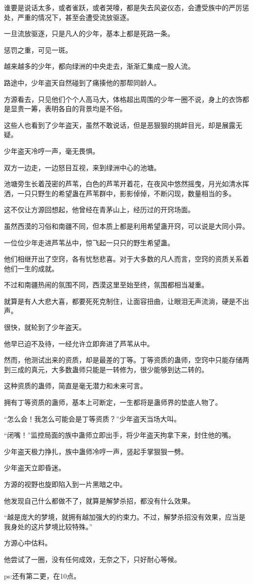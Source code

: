 \begin{this_body}
谁要是说话太多，或者雀跃，或者哭嚎，都是失去风姿仪态，会遭受族中的严厉惩处，严重的情况下，甚至会遭受流放驱逐。

一旦流放驱逐，只是凡人的少年，基本上都是死路一条。

惩罚之重，可见一斑。

越来越多的少年，都向绿洲的中央走去，渐渐汇集成一股人流。

路途中，少年盗天自然碰到了痛揍他的那帮同龄人。

方源看去，只见他们个个人高马大，体格超出周围的少年一圈不说，身上的衣饰都是显贵一筹，表明各自的背景均是不俗。

这些人也看到了少年盗天，虽然不敢说话，但是恶狠狠的挑衅目光，却是展露无疑。

少年盗天冷哼一声，毫无畏惧。

双方一边走，一边怒目互视，来到绿洲中心的池塘。

池塘旁生长着茂密的芦苇，白色的芦苇开着花，在夜风中悠然摇曳，月光如清水挥洒，一只只野生的希望蛊在芦苇群中，影影倬倬，不断闪现，数量相当的多。

这不仅让方源回想起，他曾经在青茅山上，经历过的开窍场面。

虽然西漠的习俗和南疆不同，但本质上都是利用希望蛊开窍，可以说是大同小异。

一位位少年走进芦苇丛中，惊飞起一只只的野生希望蛊。

他们相继开出了空窍，各有忧愁悲喜。对于大多数的凡人而言，空窍的资质关系着他们一生的成就。

不过和南疆热闹的氛围不同，西漠这里至始至终，氛围都相当凝重。

就算是有人大悲大喜，都要死死克制住，让面容扭曲，让眼泪无声流淌，硬是不出声。

很快，就轮到了少年盗天。

他早已迫不及待，一经允许立即奔进了芦苇从中。

然而，他测试出来的资质，却是最差的丁等。丁等资质的蛊师，空窍中只能存储两到三成的真元，大多数蛊师只能是一转修为，很少能够到达二转的。

这种资质的蛊师，简直是毫无潜力和未来可言。

拥有丁等资质的蛊师，基本上可断定，一生都将是蛊师界的垫底人物了。

“怎么会！我怎么可能会是丁等资质？”少年盗天当场大叫。

“闭嘴！”监控局面的族中蛊师立即出手，将少年盗天拘拿下来，封住他的嘴。

少年盗天极力挣扎，族中蛊师冷哼一声，竖起手掌狠狠一劈。

少年盗天立即昏迷。

方源的视野也旋即陷入到一片黑暗之中。

他发现自己什么都做不了，就算是解梦杀招，都没有什么效果。

“越是庞大的梦境，就拥有越加强大的约束力。不过，解梦杀招没有效果，应当是我身处的这片梦境比较特殊。”

方源心中估料。

他尝试了一圈，没有任何成效，无奈之下，只好耐心等候。

ps:还有第二更，在10点。

\end{this_body}

